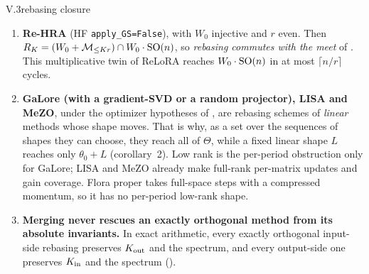 \begin{theorem}{V.3}{rebasing closure}
\begin{enumerate}[label=\arabic*.,leftmargin=1.6em]
  singular value grows, so the drift is monotone shrinkage, and the reachable set lies in $W_0$ times the block
  contraction semigroup. With unconstrained $Q$ the factors include singular ones ($\mu_k=1$), and re-merging
  generates $\prod\big(\GL^+(b)\cup\MM_{\le b-2}\big)$, or $\prod\big(\CO^+(2)\cup\{0\}\big)$ when $b=2$; this clause
  is established at the level of a proof sketch. Iterated BOFT (exact Cayley in HF) with $m'$ butterfly factors of
  block size $b$ reaches
  \[\diag(\R^m)\cdot W_0\cdot P\Big(\prod\SO\big(b\,2^{m'-1}\big)\Big)P\T,\]
  because the factor hypergraph has components of size $b\,2^{m'-1}$. For injective $W_0$ this is
  $\diag(\R^m)\cdot W_0\cdot\SO(n)$ iff $b\,2^{m'-1}=n$, the full-depth butterfly $m'=1+\log_2(n/b)$. HF's default \texttt{boft\_\allowbreak n\_\allowbreak butterfly\_\allowbreak factor=1} is
  block OFT times $\diag(s)$. A \emph{single} full-depth BOFT has dimension at most $m'\tfrac nb\binom b2$, which is
  below $\dim\SO(n)$ when $m'(b-1)<n-1$; its matrices are dense, while the set they form has positive codimension.
  \item \textbf{Re-HRA} (HF \texttt{apply\_GS=False}), with $W_0$ injective and $r$ even. Then
  $R_K=(W_0+\mathcal{M}_{\le Kr})\cap W_0\cdot\mathrm{SO}(n)$, so \emph{rebasing commutes with the meet} of .
  This multiplicative twin of ReLoRA reaches $W_0\cdot\mathrm{SO}(n)$ in at most $\lceil n/r\rceil$ cycles.
  \item \textbf{GaLore (with a gradient-SVD or a random projector), LISA and MeZO}, under the optimizer hypotheses of
  , are rebasing schemes of \emph{linear} methods whose shape moves. That is why, as a set
  over the sequences of shapes they can choose, they reach all of $\Theta$, while a fixed linear shape $L$ reaches
  only $\theta_0+L$ (corollary~2). Low rank is the per-period obstruction only for GaLore; LISA and MeZO already make
  full-rank per-matrix updates and gain coverage. Flora proper takes full-space steps with a compressed momentum, so
  it has no per-period low-rank shape.
  \item \textbf{Merging never rescues an exactly orthogonal method from its absolute invariants.} In exact arithmetic,
  every exactly orthogonal input-side rebasing preserves $K_{\rm out}$ and the spectrum, and every output-side one
  preserves $K_{\rm in}$ and the spectrum ().
\end{enumerate}
\end{theorem}

